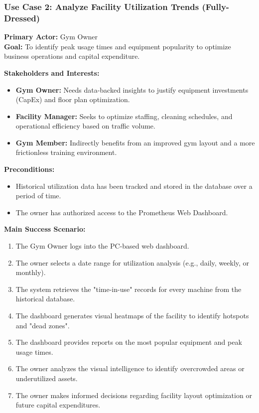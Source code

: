 \subsubsection{Use Case 2: Analyze Facility Utilization Trends (Fully-Dressed)}
\textbf{Primary Actor:} Gym Owner \\
\textbf{Goal:} To identify peak usage times and equipment popularity to optimize business operations and capital expenditure.

\textbf{Stakeholders and Interests:}
\begin{itemize}
    \item \textbf{Gym Owner:} Needs data-backed insights to justify equipment investments (CapEx) and floor plan optimization.
    \item \textbf{Facility Manager:} Seeks to optimize staffing, cleaning schedules, and operational efficiency based on traffic volume.
    \item \textbf{Gym Member:} Indirectly benefits from an improved gym layout and a more frictionless training environment.
\end{itemize}

\textbf{Preconditions:}
\begin{itemize}
    \item Historical utilization data has been tracked and stored in the database over a period of time.
    \item The owner has authorized access to the Prometheus Web Dashboard.
\end{itemize}

\textbf{Main Success Scenario:}
\begin{enumerate}
    \item The Gym Owner logs into the PC-based web dashboard.
    \item The owner selects a date range for utilization analysis (e.g., daily, weekly, or monthly).
    \item The system retrieves the "time-in-use" records for every machine from the historical database.
    \item The dashboard generates visual heatmaps of the facility to identify hotspots and "dead zones".
    \item The dashboard provides reports on the most popular equipment and peak usage times.
    \item The owner analyzes the visual intelligence to identify overcrowded areas or underutilized assets.
    \item The owner makes informed decisions regarding facility layout optimization or future capital expenditures.
\end{enumerate}

